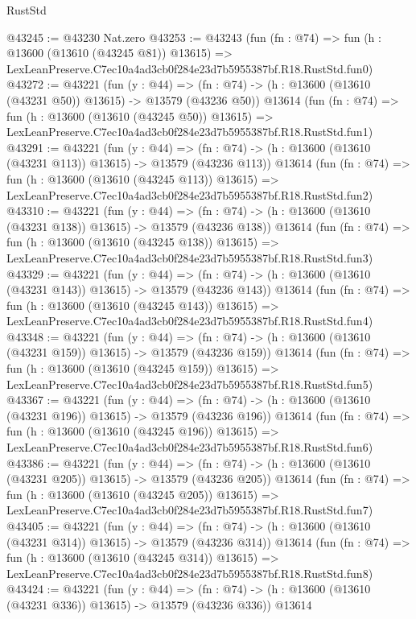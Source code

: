 \begin{lexlean}{RustStd}
\begin{coremodule}
@43245 := @43230 Nat.zero
@43253 := @43243
    (fun (fn : @74) =>
    fun (h : @13600 (@13610 (@43245 @81)) @13615) =>
    LexLeanPreserve.C7ec10a4ad3cb0f284e23d7b5955387bf.R18.RustStd.fun0)
@43272 := @43221
    (fun (y : @44) =>
    (fn : @74) -> (h : @13600 (@13610 (@43231 @50)) @13615) -> @13579 (@43236 @50))
    @13614
    (fun (fn : @74) =>
    fun (h : @13600 (@13610 (@43245 @50)) @13615) =>
    LexLeanPreserve.C7ec10a4ad3cb0f284e23d7b5955387bf.R18.RustStd.fun1)
@43291 := @43221
    (fun (y : @44) =>
    (fn : @74) -> (h : @13600 (@13610 (@43231 @113)) @13615) -> @13579 (@43236 @113))
    @13614
    (fun (fn : @74) =>
    fun (h : @13600 (@13610 (@43245 @113)) @13615) =>
    LexLeanPreserve.C7ec10a4ad3cb0f284e23d7b5955387bf.R18.RustStd.fun2)
@43310 := @43221
    (fun (y : @44) =>
    (fn : @74) -> (h : @13600 (@13610 (@43231 @138)) @13615) -> @13579 (@43236 @138))
    @13614
    (fun (fn : @74) =>
    fun (h : @13600 (@13610 (@43245 @138)) @13615) =>
    LexLeanPreserve.C7ec10a4ad3cb0f284e23d7b5955387bf.R18.RustStd.fun3)
@43329 := @43221
    (fun (y : @44) =>
    (fn : @74) -> (h : @13600 (@13610 (@43231 @143)) @13615) -> @13579 (@43236 @143))
    @13614
    (fun (fn : @74) =>
    fun (h : @13600 (@13610 (@43245 @143)) @13615) =>
    LexLeanPreserve.C7ec10a4ad3cb0f284e23d7b5955387bf.R18.RustStd.fun4)
@43348 := @43221
    (fun (y : @44) =>
    (fn : @74) -> (h : @13600 (@13610 (@43231 @159)) @13615) -> @13579 (@43236 @159))
    @13614
    (fun (fn : @74) =>
    fun (h : @13600 (@13610 (@43245 @159)) @13615) =>
    LexLeanPreserve.C7ec10a4ad3cb0f284e23d7b5955387bf.R18.RustStd.fun5)
@43367 := @43221
    (fun (y : @44) =>
    (fn : @74) -> (h : @13600 (@13610 (@43231 @196)) @13615) -> @13579 (@43236 @196))
    @13614
    (fun (fn : @74) =>
    fun (h : @13600 (@13610 (@43245 @196)) @13615) =>
    LexLeanPreserve.C7ec10a4ad3cb0f284e23d7b5955387bf.R18.RustStd.fun6)
@43386 := @43221
    (fun (y : @44) =>
    (fn : @74) -> (h : @13600 (@13610 (@43231 @205)) @13615) -> @13579 (@43236 @205))
    @13614
    (fun (fn : @74) =>
    fun (h : @13600 (@13610 (@43245 @205)) @13615) =>
    LexLeanPreserve.C7ec10a4ad3cb0f284e23d7b5955387bf.R18.RustStd.fun7)
@43405 := @43221
    (fun (y : @44) =>
    (fn : @74) -> (h : @13600 (@13610 (@43231 @314)) @13615) -> @13579 (@43236 @314))
    @13614
    (fun (fn : @74) =>
    fun (h : @13600 (@13610 (@43245 @314)) @13615) =>
    LexLeanPreserve.C7ec10a4ad3cb0f284e23d7b5955387bf.R18.RustStd.fun8)
@43424 := @43221
    (fun (y : @44) =>
    (fn : @74) -> (h : @13600 (@13610 (@43231 @336)) @13615) -> @13579 (@43236 @336))
    @13614

\end{coremodule}
\end{lexlean}
